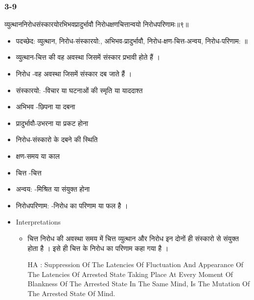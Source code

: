 \begin{frame}[fragile]\frametitle{3-9}
\begin{sanskrit}
व्युत्थाननिरोधसंस्कारयोरभिभवप्रादुर्भावौ निरोधक्षणचित्तान्वयो निरोधपरिणामः॥९॥
\end{sanskrit}

	\begin{itemize}
	\item पदच्छेद: व्युत्थान, निरोध-संस्कारयो:, अभिभव-प्रादुर्भावौ, निरोध-क्षण-चित्त-अन्वय, निरोध-परिणाम: ॥
	\item व्युत्थान-चित्त की वह अवस्था जिसमें संस्कार प्रभावी होते हैं ।
	\item निरोध -वह अवस्था जिसमें संस्कार दब जाते हैं ।
	\item संस्कारयो: -विचार या घटनाओं की स्मृति या याददाश्त
	\item अभिभव -छिपना या दबना
	\item प्रादुर्भावौ-उभरना या प्रकट होना
	\item निरोध-संस्कारो के दबने की स्थिति
	\item क्षण-समय या काल
	\item चित्त -चित्त
	\item अन्वय: -मिश्रित या संयुक्त होना
	\item निरोधपरिणाम: -निरोध का परिणाम या फल है ।	
	\item Interpretations
		\begin{itemize}	
		\item चित्त निरोध की अवस्था समय में चित्त व्युत्थान और निरोध इन दोनों ही संस्कारो से संयुक्त होता है । इसे ही चित्त के निरोध का परिणाम कहा गया है ।
		\item [HA]: Suppression Of The Latencies Of Fluctuation And Appearance Of The Latencies Of Arrested State Taking Place At Every Moment Of Blankness Of The Arrested State In The Same Mind, Is The Mutation Of The Arrested State Of Mind.
		\end{itemize}
	\end{itemize}
\end{frame}

